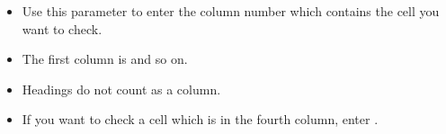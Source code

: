   \begin{itemize}
\item Use this parameter to enter the column number which contains the cell you want to check.
\item The first column is  and so on.
\item Headings do not count as a column.
\item If you want to check a  cell which is in the fourth column, enter . 

\end{itemize}     